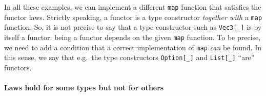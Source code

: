 In all these examples, we can implement a different \lstinline!map!
function that satisfies the functor laws. Strictly speaking, a functor
is a type constructor \emph{together with} a \lstinline!map! function.
So, it is not precise to say that a type constructor such as \lstinline!Vec3[_]!
is by itself a functor: being a functor depends on the given \lstinline!map!
function. To be precise, we need to add a condition that a correct
implementation of \lstinline!map! \emph{can} be found. In this sense,
we say that e.g.~the type constructors \lstinline!Option[_]! and
\lstinline!List[_]! ``are'' functors.

\paragraph{Laws hold for some types but not for others}

